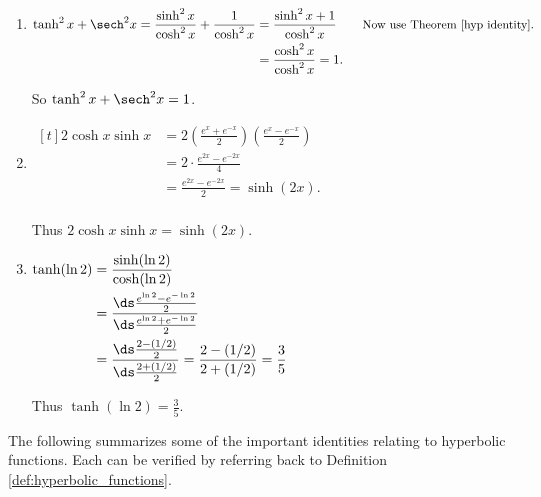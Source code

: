 \begin{solution}
\begin{enumerate}
\item $\begin{aligned}[t]
\tanh^2 x+\sech^2 x  =\frac{\sinh^2x}{\cosh^2 x} + \frac{1}{\cosh^2 x} 
					&= \frac{\sinh^2x+1}{\cosh^2 x}\qquad \text{\small Now use Theorem \ref{hyp identity}.}\\
					&= \frac{\cosh^2 x}{\cosh^2 x} = 1.\\
\end{aligned}$
 
So $\tanh^2 x+\sech^2 x=1$.
\item $\begin{aligned}[t]
	2\cosh x\sinh x &= 2\left(\frac{e^x+e^{-x}}2\right)\left(\frac{e^x-e^{-x}}2\right) \\
					&= 2 \cdot\frac{e^{2x} - e^{-2x}}4\\
					&= \frac{e^{2x} - e^{-2x}}2 = \sinh (2x).\\
			\end{aligned}$ 
			
Thus $2\cosh x\sinh x = \sinh (2x)$.
\item $\begin{aligned}[t]
	\tanh(\ln 2) & =\frac{\sinh(\ln 2)}{\cosh(\ln 2)}\\
	             & = \frac{\ds\frac{e^{\ln 2}-e^{-\ln 2}}{2}}{\ds\frac{e^{\ln 2}+e^{-\ln 2}}{2}}\\
	&=  \frac{\ds\frac{2-(1/2)}{2}}{\ds\frac{2+(1/2)}{2}}
	 =\frac{2-(1/2)}{2+(1/2)}
	= \frac{3}{5}\\
			\end{aligned}$ 
			
Thus $\tanh(\ln 2) = \frac35$.
\end{enumerate}
\end{solution}

The following summarizes some of the important identities relating to hyperbolic functions. Each can be verified by referring back to Definition \ref{def:hyperbolic_functions}.

